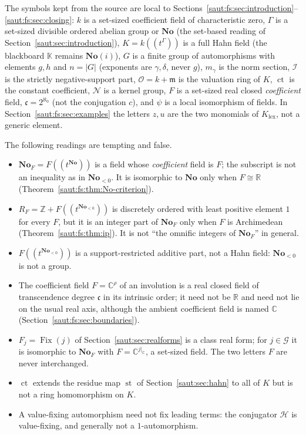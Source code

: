 \documentclass[11pt]{article}
\theoremstyle{definition}
\theoremstyle{remark}
\newcommand{\No}{\mathbf{No}}
\newcommand{\R}{\mathbb R}
\newcommand{\C}{\mathbb C}
\newcommand{\Z}{\mathbb Z}
\newcommand{\K}{\mathbb K}
\newcommand{\OO}{\mathcal O}
\newcommand{\mm}{\mathfrak m}
\newcommand{\Fix}{\operatorname{Fix}}
\newcommand{\st}{\operatorname{st}}
\newcommand{\ct}{\operatorname{ct}}
\newcommand{\cc}{\mathfrak c}
\newcommand{\Ineg}{\mathcal I}
\numberwithin{equation}{section}
\begin{document}
The symbols kept from the source are local to
Sections~\ref{saut:fs:sec:introduction}--\ref{saut:fs:sec:closing}:
$k$ is a set-sized coefficient field of characteristic zero, $\Gamma$ is a
set-sized divisible ordered abelian group or $\No$ (the set-based reading of
Section~\ref{saut:sec:introduction}), $K=k((t^\Gamma))$ is a full Hahn field (the
blackboard $\K$ remains $\No(i)$), $G$ is a finite group of automorphisms with
elements $g,h$ and $n=|G|$ (exponents are $\gamma,\delta$, never $g$), $m_\gamma$ is
the norm section, $\Ineg$ is the strictly negative-support part, $\OO=k+\mm$ is the
valuation ring of $K$, $\ct$ is the constant coefficient, $\mathcal N$ is a kernel
group, $F$ is a set-sized real closed \emph{coefficient} field, $\cc=2^{\aleph_0}$
(not the conjugation $c$), and $\psi$ is a local isomorphism of fields. In
Section~\ref{saut:fs:sec:examples} the letters $z,u$ are the two monomials of
$K_{\mathrm{lex}}$, not a generic element.

The following readings are tempting and false.
\begin{itemize}
\item $\No_F=F((t^{\No}))$ is a field whose \emph{coefficient} field is $F$; the
subscript is not an inequality as in $\No_{<0}$. It is isomorphic to $\No$ only when
$F\cong\R$ (Theorem~\ref{saut:fs:thm:No-criterion}).
\item $R_F=\Z+F((t^{\No_{<0}}))$ is discretely ordered with least positive element
$1$ for every $F$, but it is an integer part of $\No_F$ only when $F$ is Archimedean
(Theorem~\ref{saut:fs:thm:ip}). It is not ``the omnific integers of $\No_F$'' in
general.
\item $F((t^{\No_{<0}}))$ is a support-restricted additive part, not a Hahn field:
$\No_{<0}$ is not a group.
\item The coefficient field $F=\C^{\rho}$ of an involution is a real closed field of
transcendence degree $\cc$ in its intrinsic order; it need not be $\R$ and need not
lie on the usual real axis, although the ambient coefficient field is named $\C$
(Section~\ref{saut:fs:sec:boundaries}).
\item $F_j=\Fix(j)$ of Section~\ref{saut:sec:realforms} is a class real form; for
$j\in\mathcal G$ it is isomorphic to $\No_F$ with $F=\C^{j|_\C}$, a set-sized
field. The two letters $F$ are never interchanged.
\item $\ct$ extends the residue map $\st$ of Section~\ref{saut:sec:hahn} to all of $K$
but is not a ring homomorphism on $K$.
\item A value-fixing automorphism need not fix leading terms: the conjugator
$\mathcal H$ is value-fixing, and generally not a $1$-automorphism.
\end{itemize}
\end{document}
